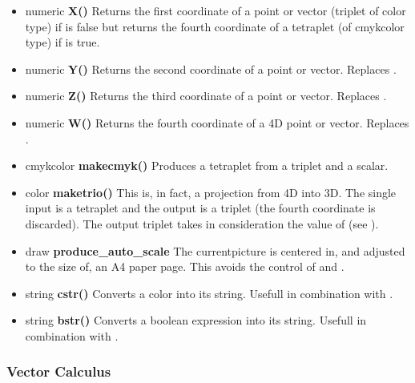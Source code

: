 \begin{itemize}
\item numeric {\bfseries X()}
Returns the first coordinate of a point or vector (triplet of
color type) if  is false but returns the fourth coordinate
of a tetraplet (of cmykcolor type) if  is true. 
\item numeric {\bfseries Y()}
Returns the second coordinate of a point or vector.
Replaces .
\item numeric {\bfseries Z()}
Returns the third coordinate of a point or vector.
Replaces .
\item numeric {\bfseries W()}
Returns the fourth coordinate of a 4D point or vector.
Replaces .
\item cmykcolor {\bfseries makecmyk()} Produces a tetraplet from a
  triplet and a scalar.
\item color {\bfseries maketrio()} This is, in fact, a projection from
  4D into 3D. The single input is a tetraplet and the output is a
  triplet (the fourth coordinate is discarded). The output triplet
  takes in consideration the value of  (see ). 
\item draw {\bfseries produce\_auto\_scale}
The currentpicture is centered in, and adjusted
to the size of, an A4
paper page. This avoids the control of  and
.
\item string {\bfseries cstr()} Converts a color into its
string. Usefull in combination with .
\item string {\bfseries bstr()} Converts a boolean 
expression into its
string. Usefull in combination with .
\end{itemize}

\subsubsection{Vector Calculus}

